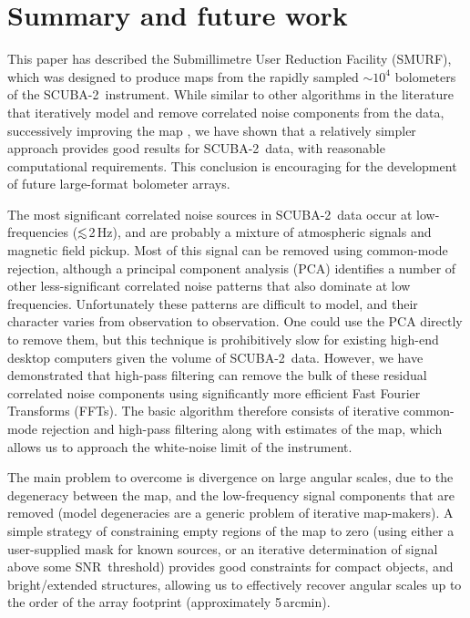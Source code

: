 \documentclass[useAMS,usenatbib,nofootinbib]{mn2e}
\newcommand{\snr}{SNR}
\newcommand{\scuba}{SCUBA-2}
\def\lsim{\mathrel{\lower2.5pt\vbox{\lineskip=0pt\baselineskip=0pt
          \hbox{$<$}\hbox{$\sim$}}}}
\begin{document}
\section{Summary and future work}
\label{sec:summary}

This paper has described the Submillimetre User Reduction Facility
(SMURF), which was designed to produce maps from the rapidly sampled
$\sim10^4$ bolometers of the \scuba\ instrument. While similar to
other algorithms in the literature that iteratively model and remove
correlated noise components from the data, successively improving the
map \citep[e.g.,][]{kovacs2008,aguirre2011}, we have shown that a
relatively simpler approach provides good results for \scuba\ data,
with reasonable computational requirements. This conclusion is
encouraging for the development of future large-format bolometer
arrays.


The most significant correlated noise sources in \scuba\ data occur at
low-frequencies ($\lsim$2\,Hz), and are probably a mixture of
atmospheric signals and magnetic field pickup. Most of this signal can
be removed using common-mode rejection, although a principal component
analysis (PCA) identifies a number of other less-significant
correlated noise patterns that also dominate at low
frequencies. Unfortunately these patterns are difficult to model, and
their character varies from observation to observation. One could use
the PCA directly to remove them, but this technique is prohibitively
slow for existing high-end desktop computers given the volume of
\scuba\ data. However, we have demonstrated that high-pass filtering
can remove the bulk of these residual correlated noise components
using significantly more efficient Fast Fourier Transforms (FFTs). The
basic algorithm therefore consists of iterative common-mode rejection
and high-pass filtering along with estimates of the map, which allows
us to approach the white-noise limit of the instrument.

The main problem to overcome is divergence on large angular scales,
due to the degeneracy between the map, and the low-frequency signal
components that are removed (model degeneracies are a generic problem
of iterative map-makers). A simple strategy of constraining empty
regions of the map to zero (using either a user-supplied mask for
known sources, or an iterative determination of signal above some
\snr\ threshold) provides good constraints for compact objects, and
bright/extended structures, allowing us to effectively recover angular
scales up to the order of the array footprint (approximately
5\,arcmin).
\end{document}

